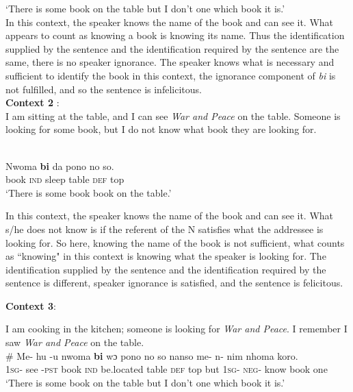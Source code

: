 \documentclass[output=paper,modfonts,nonflat,draftmode]{langsci/langscibook}
\begin{document}
\glt `There is some book on the table but I don't one which book it is.'\\

 \z  In this context, the speaker knows the name of the book and can see it. What appears to count as knowing a book is knowing its name. Thus the identification supplied by the sentence and the identification required by the sentence are the same, there is no speaker ignorance. The speaker knows what is necessary and sufficient to identify the book in this context, the ignorance component of \emph{bi} is not fulfilled, and so the sentence is infelicitous. \\

\textbf{Context 2} :\\

I am sitting at the table, and I can see \emph{\emph{War and Peace}} on the table. Someone is looking for some book, but I do not know what book they are looking for.  

\ea\label{owusu:ex62}\\
\gll Nwoma \textbf{bi} da pono no so.\\
	      book \textsc{ind}  sleep table \textsc{def} top\\

\glt `There is some book book on the table.'

 \z In this context, the speaker knows the name of the book and can see it. What s/he does not know is if the referent of the N satisfies what the addressee is looking for. So here, knowing the name of the book is not sufficient, what counts as ``knowing" in this context is knowing what the speaker is looking for.  The identification supplied by the sentence and the identification required by the sentence is different, speaker ignorance is satisfied, and the sentence is felicitous.
 
\textbf{Context 3}:

I am cooking in the kitchen; someone is looking for \emph{War and Peace}. I remember I saw \emph{War and Peace} on the table.
\ea\label{owusu:ex62}\\
\gll \# Me- hu -u nwoma \textbf{bi} wɔ pono no so nanso me- n- nim nhoma koro.\\
	     {} \textsc{1sg}- see -\textsc{pst}  book \textsc{ind}  be.located table \textsc{def}  top but \textsc{1sg}- \textsc{neg}- know book one\\

\glt `There is some book on the table but I don't one which book it is.'
\end{document}
